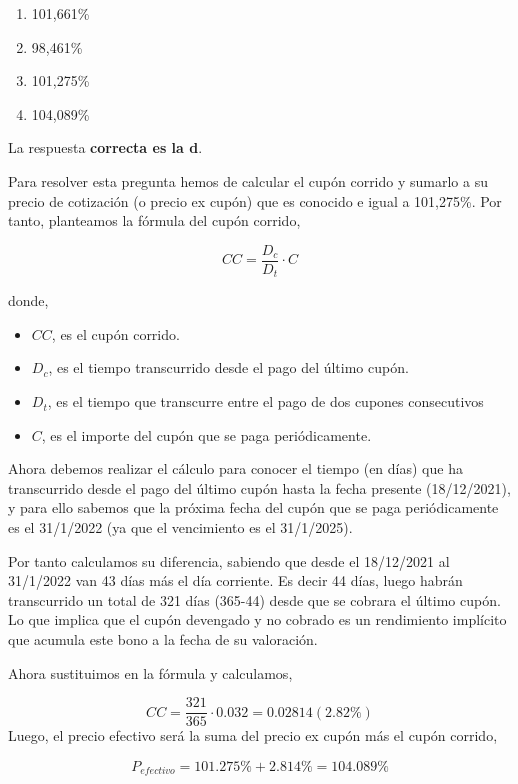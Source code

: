 \documentclass[
  letterpaper,
  DIV=11,
  numbers=noendperiod]{scrreprt}
\begin{document}
\begin{enumerate}
\def\labelenumi{\alph{enumi})}
\item
  101,661\%
\item
  98,461\%
\item
  101,275\%
\item
  104,089\%
\end{enumerate}

\begin{tcolorbox}[enhanced jigsaw, left=2mm, opacityback=0, colback=white, breakable, arc=.35mm, bottomrule=.15mm, rightrule=.15mm, toprule=.15mm, leftrule=.75mm, colframe=quarto-callout-tip-color-frame]
\begin{minipage}[t]{5.5mm}
\textcolor{quarto-callout-tip-color}{\faLightbulb}
\end{minipage}%
\begin{minipage}[t]{\textwidth - 5.5mm}

La respuesta \textbf{correcta es la d}.

Para resolver esta pregunta hemos de calcular el cupón corrido y sumarlo
a su precio de cotización (o precio ex cupón) que es conocido e igual a
101,275\%. Por tanto, planteamos la fórmula del cupón corrido,

\[CC=\frac{D_c}{D_t}\cdot C\]

donde,

\begin{itemize}
\item
  \(CC\), es el cupón corrido.
\item
  \(D_{c}\), es el tiempo transcurrido desde el pago del último cupón.
\item
  \(D_{t}\), es el tiempo que transcurre entre el pago de dos cupones
  consecutivos
\item
  \(C\), es el importe del cupón que se paga periódicamente.
\end{itemize}

Ahora debemos realizar el cálculo para conocer el tiempo (en días) que
ha transcurrido desde el pago del último cupón hasta la fecha presente
(18/12/2021), y para ello sabemos que la próxima fecha del cupón que se
paga periódicamente es el 31/1/2022 (ya que el vencimiento es el
31/1/2025).

Por tanto calculamos su diferencia, sabiendo que desde el 18/12/2021 al
31/1/2022 van 43 días más el día corriente. Es decir 44 días, luego
habrán transcurrido un total de 321 días (365-44) desde que se cobrara
el último cupón. Lo que implica que el cupón devengado y no cobrado es
un rendimiento implícito que acumula este bono a la fecha de su
valoración.

Ahora sustituimos en la fórmula y calculamos,

\[CC=\frac{321}{365}\cdot 0.032=0.02814(2.82\%)\] Luego, el precio
efectivo será la suma del precio ex cupón más el cupón corrido,

\[P_{efectivo}=101.275\%+2.814\%=104.089\%\]

\end{minipage}%
\end{tcolorbox}
\end{document}
